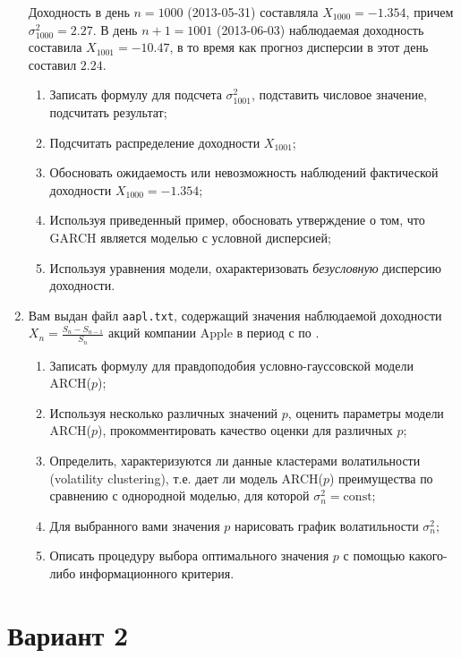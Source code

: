 \documentclass[a4paper,14pt]{extreport}
\renewcommand{\=}[1]{\stackrel{#1}{=}} %
\begin{document}
\begin{enumerate}
	Доходность в день $n = 1000$ (2013-05-31) составляла
	$X_{1000} = -1.354$, причем $\sigma^2_{1000} =  2.27$.
	В день $n + 1 = 1001$ (2013-06-03)
	наблюдаемая доходность составила $X_{1001} = -10.47$,
	в то время как прогноз дисперсии в этот день составил $2.24$.

	\begin{enumerate}
	\item Записать формулу для подсчета $\sigma^2_{1001}$, 
	подставить числовое значение, подсчитать результат;
	\item Подсчитать распределение доходности $X_{1001}$;
	\item Обосновать ожидаемость или невозможность наблюдений
	фактической доходности $X_{1000} = -1.354$;
	\item Используя приведенный пример, обосновать утверждение
	о том, что GARCH является моделью с условной дисперсией;
	\item Используя уравнения модели, охарактеризовать
	{\em безусловную} дисперсию доходности.
	\end{enumerate}

	\item Вам выдан файл \texttt{aapl.txt}, содержащий
	значения наблюдаемой доходности
	$X_n = \frac{S_n - S_{n-1}}{S_n}$ акций компании Apple 
	в период с по .

	\begin{enumerate}
	\item Записать формулу для правдоподобия условно-гауссовской модели
	ARCH($p$);
	\item Используя несколько различных значений $p$,
	оценить параметры модели ARCH($p$),
	прокомментировать качество оценки для различных $p$;
	\item Определить, характеризуются ли данные кластерами волатильности
	(volatility clustering), т.е. дает ли модель ARCH($p$) 
	преимущества по сравнению с однородной моделью,
	для которой $\sigma^2_n = \mathrm{const}$;
	\item Для выбранного вами значения $p$ нарисовать график
	волатильности $\sigma^2_n$;
	\item Описать процедуру выбора оптимального значения $p$
	с помощью какого-либо информационного критерия.
	\end{enumerate}


\end{enumerate}


\newpage 

\section*{Вариант 2}
\end{document}
